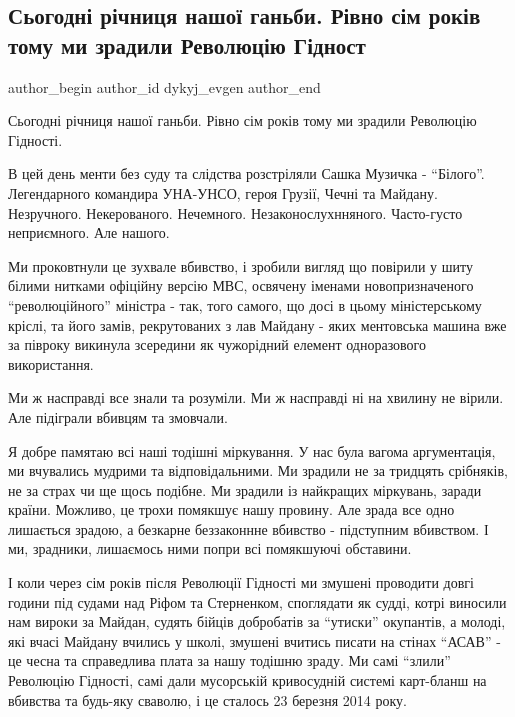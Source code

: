  
 
 
 
 
 
\subsection{Сьогодні річниця нашої ганьби. Рівно сім років тому ми зрадили Революцію Гідност}
\label{sec:23_03_2021.fb.dykyj_evgen.1.revgidnosti_ganjba}
\ifcmt
 author_begin
   author_id dykyj_evgen
 author_end
\fi

Сьогодні річниця нашої ганьби. Рівно сім років тому ми зрадили Революцію Гідності.

В цей день менти без суду та слідства розстріляли Сашка Музичка - \enquote{Білого}.
Легендарного командира УНА-УНСО, героя Грузії, Чечні та Майдану. Незручного.
Некерованого. Нечемного. Незаконослухнняного. Часто-густо неприємного. Але
нашого.

Ми проковтнули це зухвале вбивство, і зробили вигляд що повірили у шиту білими
нитками офіційну версію МВС, освячену іменами новопризначеного \enquote{революційного}
міністра - так, того самого, що досі в цьому міністерському кріслі, та його
замів, рекрутованих з лав Майдану - яких ментовська машина вже за півроку
викинула зсередини як чужорідний елемент одноразового використання.

Ми ж насправді все знали та розуміли. Ми ж насправді ні на хвилину не вірили.
Але підіграли вбивцям та змовчали.

Я добре памятаю всі наші тодішні міркування. У нас була вагома аргументація, ми
вчувались мудрими та відповідальними. Ми зрадили не за тридцять срібняків, не
за страх чи ще щось подібне. Ми зрадили із найкращих міркувань, заради країни.
Можливо, це трохи помякшує нашу провину. Але зрада все одно лишається зрадою, а
безкарне беззаконнне вбивство - підступним вбивством. І ми, зрадники, лишаємось
ними попри всі помякшуючі обставини.

І коли через сім років після Революції Гідності ми змушені проводити довгі
години під судами над Ріфом та Стерненком, споглядати як судді, котрі виносили
нам вироки за Майдан, судять бійців добробатів за \enquote{утиски} окупантів, а молоді,
які вчасі Майдану вчились у школі, змушені вчитись писати на стінах \enquote{АСАВ} - це
чесна та справедлива плата за нашу тодішню зраду. Ми самі \enquote{злили} Революцію
Гідності, самі дали мусорській кривосудній системі карт-бланш на вбивства та
будь-яку сваволю, і це сталось 23 березня 2014 року. 

